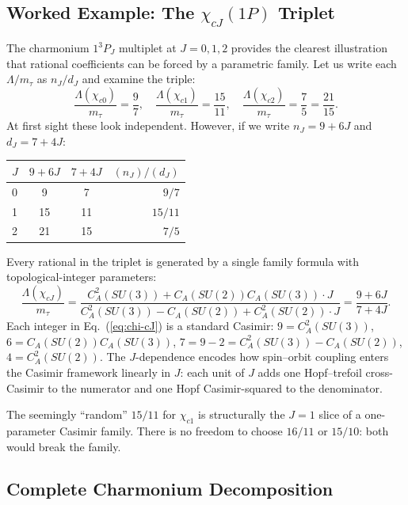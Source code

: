 \documentclass[11pt]{article}
\newcommand{\CA}{C_A}
\begin{document}
\subsection{Worked Example: The $\chi_{cJ}(1P)$ Triplet}

The charmonium $1^3P_J$ multiplet at $J = 0, 1, 2$ provides the
clearest illustration that rational coefficients can be forced by
a parametric family.  Let us write each $\Lambda/m_\tau$
as $n_J/d_J$ and examine the triple:
\begin{equation}
  \frac{\Lambda(\chi_{c0})}{m_\tau} = \frac{9}{7},\quad
  \frac{\Lambda(\chi_{c1})}{m_\tau} = \frac{15}{11},\quad
  \frac{\Lambda(\chi_{c2})}{m_\tau} = \frac{7}{5} = \frac{21}{15}.
\end{equation}
At first sight these look independent.  However, if we write
$n_J = 9 + 6J$ and $d_J = 7 + 4J$:
\begin{center}
\begin{tabular}{lccr}
\toprule
$J$ & $9 + 6J$ & $7 + 4J$ & $(n_J)/(d_J)$ \\
\midrule
0 & 9 & 7 & $9/7$ \\
1 & 15 & 11 & $15/11$ \\
2 & 21 & 15 & $7/5$ \\
\bottomrule
\end{tabular}
\end{center}
Every rational in the triplet is generated by a single family
formula with topological-integer parameters:
\begin{equation}
  \boxed{\
  \frac{\Lambda(\chi_{cJ})}{m_\tau} =
  \frac{\CA^2(SU(3)) + \CA(SU(2))\CA(SU(3))\cdot J}
       {\CA^2(SU(3)) - \CA(SU(2)) + \CA^2(SU(2))\cdot J}
  = \frac{9 + 6J}{7 + 4J}.
  \ }
\label{eq:chi-cJ}
\end{equation}
Each integer in Eq.~(\ref{eq:chi-cJ}) is a standard Casimir:
$9 = \CA^2(SU(3))$, $6 = \CA(SU(2))\CA(SU(3))$,
$7 = 9-2 = \CA^2(SU(3)) - \CA(SU(2))$,
$4 = \CA^2(SU(2))$.  The $J$-dependence encodes how spin--orbit
coupling enters the Casimir framework linearly in $J$: each unit
of $J$ adds one Hopf--trefoil cross-Casimir to the numerator and
one Hopf Casimir-squared to the denominator.

The seemingly ``random'' $15/11$ for $\chi_{c1}$ is
structurally the $J=1$ slice of a one-parameter Casimir family.
There is no freedom to choose $16/11$ or $15/10$: both would
break the family.

\subsection{Complete Charmonium Decomposition}
\end{document}

